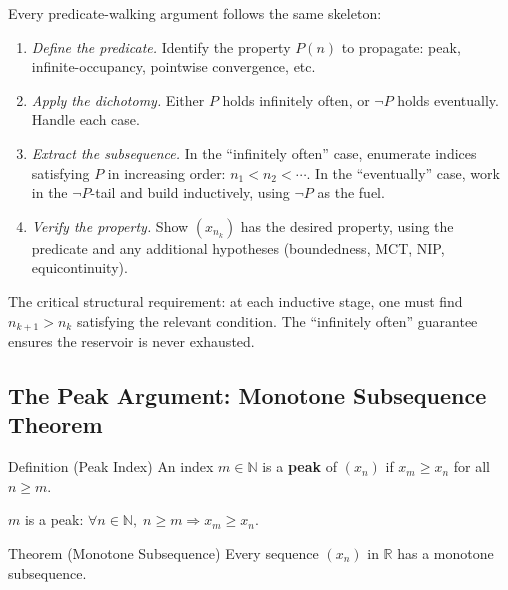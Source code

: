 \begin{remark}
\label{rem:extraction-template}
Every predicate-walking argument follows the same skeleton:
\begin{enumerate}
  \item \emph{Define the predicate.} Identify the property $P(n)$ to
        propagate: peak, infinite-occupancy, pointwise convergence, etc.
  \item \emph{Apply the dichotomy.} Either $P$ holds infinitely often, or
        $\neg P$ holds eventually. Handle each case.
  \item \emph{Extract the subsequence.} In the ``infinitely often'' case,
        enumerate indices satisfying $P$ in increasing order:
        $n_1<n_2<\cdots$. In the ``eventually'' case, work in the
        $\neg P$-tail and build inductively, using $\neg P$ as the fuel.
  \item \emph{Verify the property.} Show $(x_{n_k})$ has the desired
        property, using the predicate and any additional hypotheses
        (boundedness, MCT, NIP, equicontinuity).
\end{enumerate}
The critical structural requirement: at each inductive stage, one must find
$n_{k+1}>n_k$ satisfying the relevant condition. The ``infinitely often''
guarantee ensures the reservoir is never exhausted.
\end{remark}

\subsection*{The Peak Argument: Monotone Subsequence Theorem}
\label{subsec:peak-argument}

\begin{definitionbox}{Definition (Peak Index)}
\label{def:peak}
An index $m\in\mathbb{N}$ is a \textbf{peak} of $(x_n)$ if
$x_m\geq x_n$ for all $n\geq m$.
\end{definitionbox}

\begin{remark}
$m$ is a peak: $\forall n\in\mathbb{N},\;n\geq m\Rightarrow x_m\geq x_n$.
\end{remark}

\begin{theorembox}{Theorem (Monotone Subsequence)}
\label{thm:monotone-subsequence}
Every sequence $(x_n)$ in $\mathbb{R}$ has a monotone subsequence.
\end{theorembox}

